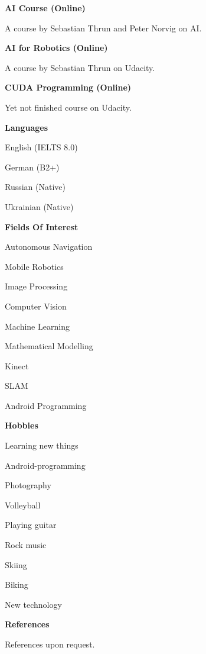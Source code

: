 \documentclass[a4paper,12pt,final]{memoir}
\newcommand{\Sep}{\vspace{1.5em}}
\newcommand{\SmallSep}{\vspace{0.5em}}
\newcommand{\CVSection}[1]
	{\Large\textbf{#1}\par
	\SmallSep\normalsize\normalfont}
\newcommand{\CVItem}[1]
	{\textbf{\color{MidnightBlue} #1}}
\begin{document}
\CVItem{AI Course (Online)}
\begin{compactitem}[\color{MidnightBlue}$\circ$]
	\item A course by Sebastian Thrun and Peter Norvig on AI.
\end{compactitem}
\SmallSep

\CVItem{AI for Robotics (Online)}
\begin{compactitem}[\color{MidnightBlue}$\circ$]
	\item A course by Sebastian Thrun on Udacity.
\end{compactitem}
\SmallSep

\CVItem{CUDA Programming (Online)}
\begin{compactitem}[\color{MidnightBlue}$\circ$]
	\item Yet not finished course on Udacity.
\end{compactitem}
\SmallSep

\CVSection{Languages}
\begin{compactitem}[\color{MidnightBlue}$\circ$]
	\item English (IELTS 8.0)
	\item German (B2+)
	\item Russian (Native)
	\item Ukrainian (Native)
\end{compactitem}
\Sep

\CVSection{Fields Of Interest}
\begin{compactitem}[\color{MidnightBlue}$\circ$]
	\item Autonomous Navigation
	\item Mobile Robotics
	\item Image Processing
	\item Computer Vision
	\item Machine Learning
	\item Mathematical Modelling
	\item Kinect
	\item SLAM
	\item Android Programming
\end{compactitem}
\Sep

\CVSection{Hobbies}
\begin{compactitem}[\color{MidnightBlue}$\circ$]
	\item Learning new things
	\item Android-programming
	\item Photography
	\item Volleyball
	\item Playing guitar
	\item Rock music
	\item Skiing
	\item Biking
	\item New technology
\end{compactitem}
\Sep
\CVSection{References}
References upon request.
\clearpage
\framebreak

\end{document}
